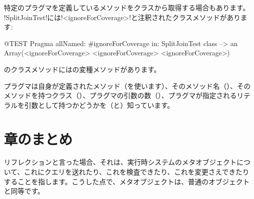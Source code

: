 \documentclass[a4paper,10pt,twoside]{book}
\begin{document}
特定のプラグマを定義しているメソッドをクラスから取得する場合もあります。
\ct!SplitJoinTest!には\ct!<ignoreForCoverage>!と注釈されたクラスメソッドがあります:

\begin{code}{@TEST}
Pragma allNamed: #ignoreForCoverage in: SplitJoinTest class  --> an Array(<ignoreForCoverage> <ignoreForCoverage> <ignoreForCoverage>)
\end{code}

のクラスメソッドにはの変種メソッドがあります。

プラグマは自身が定義されたメソッド（を使います）、そのメソッド名（）、そのメソッドを持つクラス（）、プラグマの引数の数（）、プラグマが指定されるリテラルを引数として持つかどうかを（と）知っています。


\section{章のまとめ}

リフレクションと言った場合、それは、実行時システムのメタオブジェクトについて、これにクエリを送れたり、これを検査できたり、これを変更さえできたりすることを指します。こうした点で、メタオブジェクトは、普通のオブジェクトと同等です。
\end{document}
